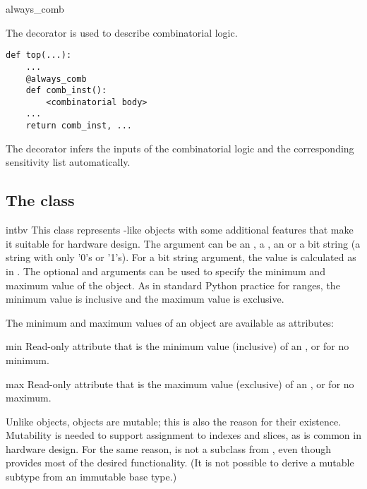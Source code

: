 \begin{funcdesc}{always_comb}{}


The  decorator is used to describe combinatorial
logic.


\begin{verbatim}
def top(...):
    ...
    @always_comb
    def comb_inst():
        <combinatorial body>
    ...
    return comb_inst, ...
\end{verbatim}


The  decorator infers the inputs of the combinatorial
logic and the corresponding sensitivity list automatically.

\end{funcdesc}


\subsection{The  class \label{ref-intbv}}

\begin{classdesc}{intbv}{  
}
This class represents -like objects with some additional
features that make it suitable for hardware design. The 
argument can be an , a , an  or a
bit string (a string with only '0's or '1's). For a bit string
argument, the value is calculated as in .  The optional  and  arguments can be used to
specify the minimum and maximum value of the  object. As
in standard Python practice for ranges, the minimum value is inclusive
and the maximum value is exclusive.
\end{classdesc}

The minimum and maximum values of an  object
are available as attributes:

\begin{memberdesc}[intbv]{min}
Read-only attribute that is the minimum value (inclusive) of an
, or  for no minimum.
\end{memberdesc}
\begin{memberdesc}[intbv]{max}
Read-only attribute that is the maximum value
(exclusive) of an , or  for no 
maximum.
\end{memberdesc}

Unlike  objects,  objects are mutable; this is
also the reason for their existence. Mutability is needed to support
assignment to indexes and slices, as is common in hardware design. For
the same reason,  is not a subclass from ,
even though  provides most of the desired
functionality. (It is not possible to derive a mutable subtype from
an immutable base type.)

